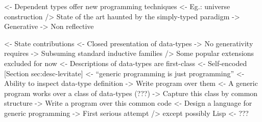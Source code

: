 \documentclass[preprint
              , authoryear
              ]{sigplanconf}
\newenvironment{wstructure}{\comment}{\endcomment}
\begin{document}
%

\begin{wstructure}
    <- Dependent types offer new programming techniques
        <- Eg.: universe construction
        /> State of the art haunted by the simply-typed paradigm
            -> Generative
            -> Non reflective
\end{wstructure}


\begin{wstructure}
<- State contributions
    <- Closed presentation of data-types 
        -> No generativity requires
        -> Subsuming standard inductive families 
            /> Some popular extensions excluded for now
    <- Descriptions of data-types are first-class 
        <- Self-encoded [Section sec:desc-levitate]
    <- ``generic programming is just programming''
        <- Ability to inspect data-type definition
            -> Write program over them
        <- A generic program works over a class of data-types (???)
            -> Capture this class by common structure
            -> Write a program over this common code
    <- Design a language for generic programming
        -> First serious attempt
            /> except possibly Lisp
                <- ???
\end{wstructure}

\end{document}
